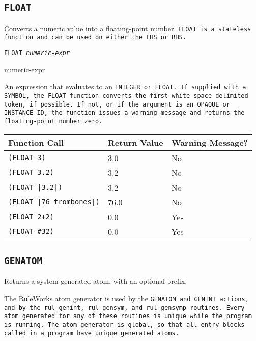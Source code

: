 \subsection{\tt{FLOAT}}

Converts a numeric value into a floating-point number. \tt{FLOAT} is a
stateless function and can be used on either the LHS or RHS.

\Format

\tt{FLOAT} \it{numeric-expr}

\begin{arguments}
\item[numeric-expr]

  An expression that evaluates to an \tt{INTEGER} or \tt{FLOAT}. If
  supplied with a \tt{SYMBOL}, the \tt{FLOAT} function converts the
  first white space delimited token, if possible. If not, or if the
  argument is an \tt{OPAQUE} or \tt{INSTANCE-ID}, the function issues
  a warning message and returns the floating-point number zero.
\end{arguments}

\begin{center}
  \begin{tabular}{lll}
    \toprule
    Function Call & Return Value &  Warning Message? \\
    \midrule
    \verb,(FLOAT 3), & 3.0  & No \\
    \verb,(FLOAT 3.2), &  3.2 & No \\
    \verb,(FLOAT |3.2|), &  3.2 & No \\
    \verb,(FLOAT |76 trombones|), & 76.0 &  No \\
    \verb,(FLOAT 2+2), & 0.0 & Yes \\
    \verb,(FLOAT #32), &  0.0 &  Yes \\
    \bottomrule
  \end{tabular}
\end{center}

\subsection{\tt{GENATOM}}

Returns a system-generated atom, with an optional prefix.

The RuleWorks atom generator is used by the \tt{GENATOM} and
\tt{GENINT} actions, and by the \verb|rul_genint|, \verb|rul_gensym|,
and \verb|rul_gensymp| routines. Every atom generated for any of these
routines is unique while the program is running. The atom generator is
global, so that all entry blocks called in a program have unique
generated atoms.


